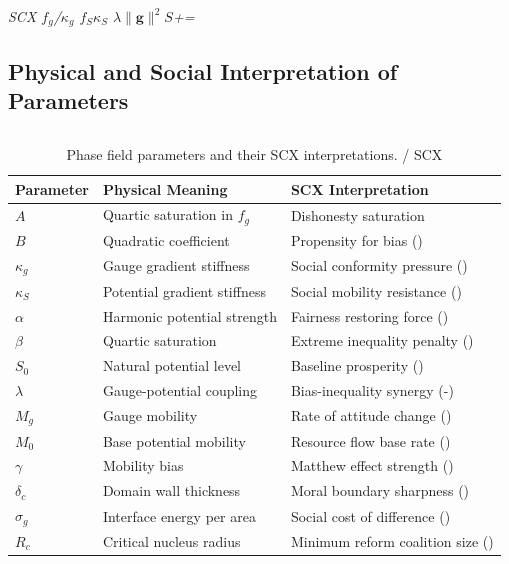 \documentclass[12pt,a4paper]{article}
\theoremstyle{plain}
\theoremstyle{definition}
\newcommand{\gf}{\mathbf{g}}          %
\newcommand{\Sf}{S}                   %
\newcommand{\deltac}{\delta_c}        %
\newcommand{\Rc}{R_c}                 %
\newcommand{\cn}[1]{\textcolor{scxgray}{\textit{#1}}}
\begin{document}
\bigskip
\noindent
\cn{SCX $f_g$/$\kappa_g$ $f_S$$\kappa_S$ $\lambda\|\gf\|^2\Sf$+=}

\subsection{Physical and Social Interpretation of Parameters}
\subsection*{}

\begin{table}[H]
\centering
\begin{tabular}{p{}p{}p{}}
\toprule
\textbf{Parameter} & \textbf{Physical Meaning} & \textbf{SCX Interpretation} \\
\midrule
$A$ & Quartic saturation in $f_g$ & Dishonesty saturation \\
$B$ & Quadratic coefficient & Propensity for bias () \\
$\kappa_g$ & Gauge gradient stiffness & Social conformity pressure () \\
$\kappa_S$ & Potential gradient stiffness & Social mobility resistance () \\
$\alpha$ & Harmonic potential strength & Fairness restoring force () \\
$\beta$ & Quartic saturation & Extreme inequality penalty () \\
$\Sf_0$ & Natural potential level & Baseline prosperity () \\
$\lambda$ & Gauge-potential coupling & Bias-inequality synergy (-) \\
$M_g$ & Gauge mobility & Rate of attitude change () \\
$M_0$ & Base potential mobility & Resource flow base rate () \\
$\gamma$ & Mobility bias & Matthew effect strength () \\
$\deltac$ & Domain wall thickness & Moral boundary sharpness () \\
$\sigma_g$ & Interface energy per area & Social cost of difference () \\
$\Rc$ & Critical nucleus radius & Minimum reform coalition size () \\
\bottomrule
\end{tabular}
\caption{Phase field parameters and their SCX interpretations. / SCX}
\label{tab:parameters}
\end{table}
\end{document}
